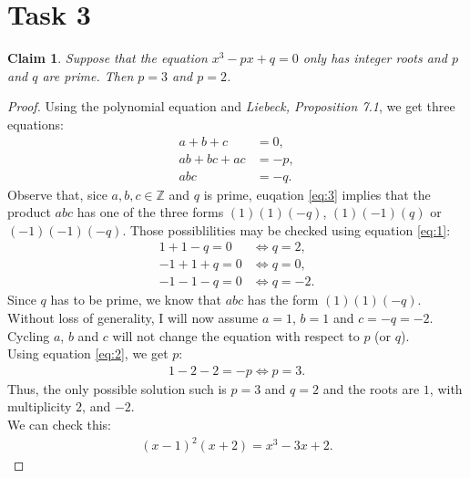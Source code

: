 \documentclass{article}
\newcommand{\Z}{\mathbb{Z}}
\newtheorem{claim}[section]{Claim}
\begin{document}
\section*{Task 3}
\begin{claim}
  Suppose that the equation
    $x^3-px+q=0$
  only has integer roots and $p$ and $q$ are prime.
  Then $p=3$ and $p=2$.
\end{claim}
\begin{proof}
  Using the polynomial equation and \emph{Liebeck, Proposition 7.1}, we get three equations:
  \begin{align}
    a+b+c&=0,\label{eq:1}\\
    ab+bc+ac&=-p, \label{eq:2}\\
    abc&=-q. \label{eq:3}
  \end{align}
  Observe that, sice $a,b,c\in\Z$ and $q$ is prime, euqation \ref{eq:3} implies that the product $abc$ has one of the three forms $(1)(1)(-q)$, $(1)(-1)(q)$ or $(-1)(-1)(-q)$.
  Those possiblilities may be checked using equation \ref{eq:1}:
  \begin{align*}
    1+1-q=0&\Leftrightarrow q=2,\\
    -1+1+q=0&\Leftrightarrow q=0,\\
    -1-1-q=0&\Leftrightarrow q=-2.
  \end{align*}
  Since $q$ has to be prime, we know that $abc$ has the form $(1)(1)(-q)$.
  Without loss of generality, I will now assume $a=1$, $b=1$ and $c=-q=-2$.
  Cycling $a$, $b$ and $c$ will not change the equation with respect to $p$ (or $q$).\\
  Using equation \ref{eq:2}, we get $p$:
  \begin{align*}
    1-2-2=-p \Leftrightarrow p = 3.
  \end{align*}
  Thus, the only possible solution such is $p=3$ and $q=2$ and the roots are $1$, with multiplicity $2$, and $-2$.\\
  We can check this:
  \begin{align*}
    (x-1)^2(x+2)=x^3-3x+2. 
  \end{align*}
\end{proof}
\end{document}

